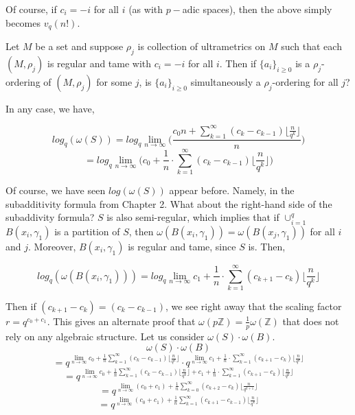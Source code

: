 Of course, if $c_i=-i$ for all $i$ (as with $p-$adic spaces), then the above simply becomes $v_q(n!)$. 

\begin{question}
	Let $M$ be a set and suppose $\rho_j$ is collection of ultrametrics on $M$ such that each $(M,\rho_j)$ is regular and tame with $c_i=-i$ for all $i$. Then if $\{a_i\}_{i \geq 0 }$ is a $\rho_j$-ordering of $(M,\rho_j)$ for some $j$, is $\{a_i\}_{i \geq 0 }$ simultaneously a $\rho_j$-ordering for all $j$?
\end{question}
In any case, we have,

\[log_q(\omega(S)) ={log_q \lim_{n\to\infty} ( \frac{c_0n + \sum_{k=1}^{\infty} (c_{k} - c_{k-1}) \lfloor\frac{n}{q^{k}}\rfloor}{n}}) \]
\[ ={log_q \lim_{n\to\infty} (c_0 + \frac{1}{n}\cdot \sum_{k=1}^{\infty} (c_{k} - c_{k-1}) \lfloor\frac{n}{q^{k}}\rfloor})\]

Of course, we have seen $log(\omega(S))$ appear before. Namely, in the subadditivity formula from Chapter 2. What about the right-hand side of the subaddivity formula? $S$ is also semi-regular, which implies that if $\cup_{i=1}^q$ $B(x_i,\gamma_1)$ is a partition of $S$, then $\omega(B(x_i,\gamma_1))=\omega(B(x_j,\gamma_1))$ for all $i$ and $j$. Moreover, $B(x_i,\gamma_1)$ is regular and tame, since $S$ is. Then, 

\[log_q(\omega(B(x_i,\gamma_1))) = log_q\lim_{n\to\infty} c_1 + \frac{1}{n}\cdot \sum_{k=1}^{\infty} (c_{k+1} - c_{k}) \lfloor \frac{n}{q^{k}}\rfloor\]

Then if $(c_{k+1} - c_{k}) = (c_{k} - c_{k-1})$, we see right away that the scaling factor $r=q^{c_0+c_1}$. This gives an alternate proof that $\omega(p\mathbb{Z}) = \frac{1}{p}\omega(\mathbb{Z})$ that does not rely on any algebraic structure. Let us consider $\omega(S)\cdot \omega(B)$.\\

\[\omega(S)\cdot \omega(B) \]
\[= q^{\lim_{n\to\infty} c_0 + \frac{1}{n}\sum_{k=1}^{\infty} (c_{k} - c_{k-1}) \lfloor\frac{n}{q^{k}}\rfloor} \cdot q ^{\lim_{n\to\infty} c_1 + \frac{1}{n} \cdot\sum_{k=1}^{\infty} (c_{k+1} - c_{k}) \lfloor \frac{n}{q^{k}}\rfloor}\]
\[= q^{\lim_{n\to\infty} c_0 + \frac{1}{n}\sum_{k=1}^{\infty} (c_{k} - c_{k-1}) \lfloor\frac{n}{q^{k}}\rfloor + c_1 + \frac{1}{n}\cdot \sum_{k=1}^{\infty} (c_{k+1} - c_{k}) \lfloor \frac{n}{q^{k}}\rfloor}\]
\[= q^{\lim_{n\to\infty} (c_0+c_1) + \frac{1}{n}\sum_{k=0}^{\infty} (c_{k+2} - c_{k}) \lfloor\frac{n}{q^{k+1}}\rfloor}\]
\[= q^{\lim_{n\to\infty} (c_0+c_1) + \frac{1}{n}\sum_{k=1}^{\infty} (c_{k+1} - c_{k-1}) \lfloor\frac{n}{q^{k}}\rfloor}\]


